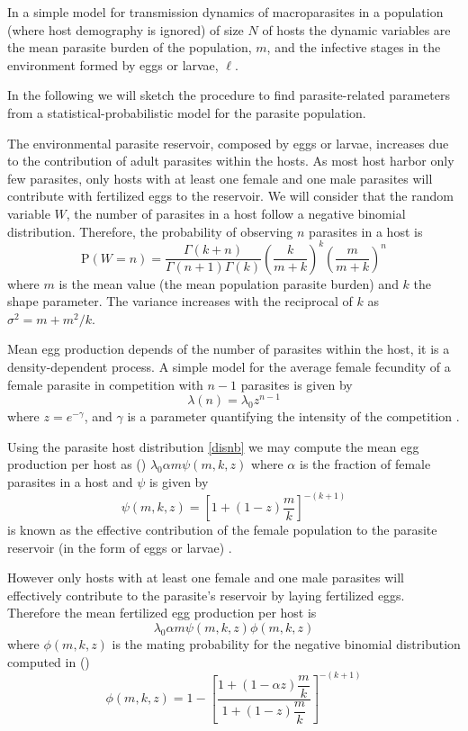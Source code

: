 \documentclass[12pt,a4paper]{article}
\theoremstyle{plain}%
\theoremstyle{definition}
\theoremstyle{remark}
\begin{document}
In a simple model for transmission dynamics of macroparasites in a population (where host demography is ignored) of size $N$ of hosts 
the dynamic variables  are the mean parasite burden of the population, $m$, and the infective stages in the environment formed by eggs or larvae, $\ell$.

In the following we will sketch the procedure to find parasite-related parameters from a statistical-probabilistic model for the parasite population.

The environmental parasite reservoir, composed by eggs or larvae, increases due to the contribution of adult parasites within the hosts. As most host harbor only few parasites, only hosts with at least one female and one male parasites will contribute with fertilized eggs to the reservoir. We will consider that the random variable $W$, the number of parasites in a host follow a negative binomial distribution. 
Therefore, the probability of observing $n$ parasites in a host is
\begin{equation}\label{disnb}
\mathrm{P}(W=n)=\frac{\Gamma(k+n)}{\Gamma(n+1)\Gamma(k)}\left( \frac{k}{m+k}\right) ^{k} \left( \frac{m}{m+k}\right) ^n
\end{equation}
where $m$ is the mean value (the mean population parasite burden) and $k$ the shape parameter. 
The variance increases with the reciprocal of $k$ as $\sigma^2=m+m^2/k$.

Mean egg production depends of the number of parasites within the host, it is a density-dependent process. 
A simple model for the average female fecundity of a female parasite in competition with $n-1$ parasites is given by 
$$\lambda(n)=\lambda_0 z^{n-1}$$ where $z=e^{-\gamma}$, and $\gamma$ is a parameter quantifying the intensity of the competition \cite{hall2000geographical}. 

Using the parasite host distribution \ref{disnb} we may compute the mean egg production per host as (\cite{lopez2022general})
$\lambda_0
\alpha m
\psi(m,k,z)$
where $\alpha$  is the fraction of female parasites in a host and $\psi$ is given by
\begin{equation}
\psi(m,k,z)=\left[ 1+(1-z)\dfrac{m}{k}\right]^{-(k+1)}
\end{equation}
 is  known as the effective contribution of the female population to the parasite reservoir (in the form of eggs or larvae) \cite{churcher2006density}.

However only hosts with at least one female and one male parasites will effectively contribute to the parasite's reservoir by laying fertilized eggs. Therefore the mean fertilized egg production per host is 
\begin{equation}\label{meanfertilizedeggs}
\lambda_0
\alpha m
\psi(m,k,z)\phi(m,k,z)
\end{equation} 
where $\phi(m,k,z)$ is the mating probability for the negative binomial distribution computed in (\cite{lopez2022general})
 \begin{equation}
 \phi(m,k,z)=1-\left[ \frac{1+ \left( 1-
 	\alpha z
 	\right) \dfrac{m}{k}}{1+(1-z)\dfrac{m}{k}}\right] ^{-(k+1)}
 \end{equation}
\end{document}
